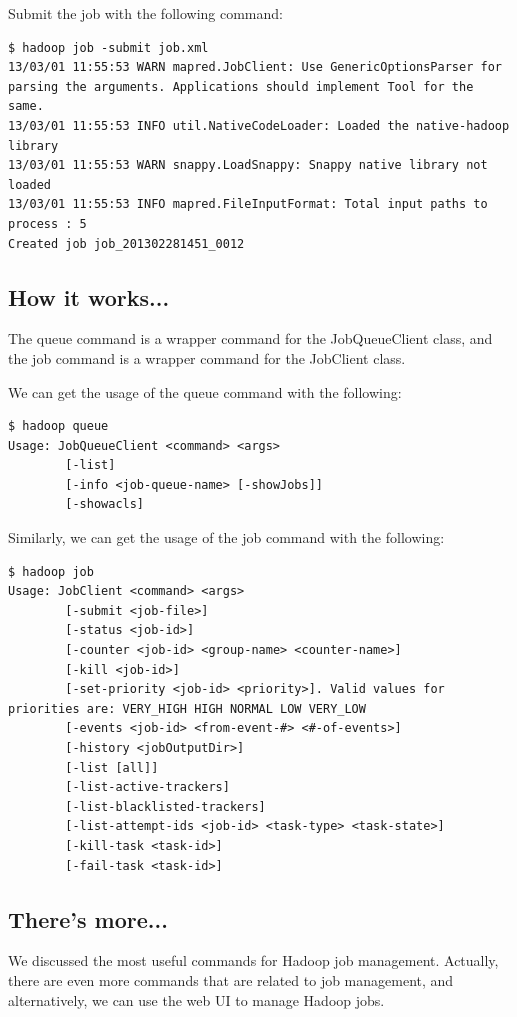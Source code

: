 Submit the job with the following command:
\lstset{style=bashstyle}
\begin{lstlisting}
$ hadoop job -submit job.xml
13/03/01 11:55:53 WARN mapred.JobClient: Use GenericOptionsParser for parsing the arguments. Applications should implement Tool for the same.
13/03/01 11:55:53 INFO util.NativeCodeLoader: Loaded the native-hadoop library
13/03/01 11:55:53 WARN snappy.LoadSnappy: Snappy native library not loaded
13/03/01 11:55:53 INFO mapred.FileInputFormat: Total input paths to process : 5
Created job job_201302281451_0012
\end{lstlisting}
\subsection*{How it works...}
The queue command is a wrapper command for the JobQueueClient class, and the job command is a wrapper command for the JobClient class.

We can get the usage of the queue command with the following:
\begin{verbatim}
$ hadoop queue
Usage: JobQueueClient <command> <args>
        [-list]
        [-info <job-queue-name> [-showJobs]]
        [-showacls]
\end{verbatim}

Similarly, we can get the usage of the job command with the following: 
\lstset{style=bashstyle}
\begin{lstlisting}
$ hadoop job
Usage: JobClient <command> <args>
        [-submit <job-file>]
        [-status <job-id>]
        [-counter <job-id> <group-name> <counter-name>]
        [-kill <job-id>]
        [-set-priority <job-id> <priority>]. Valid values for priorities are: VERY_HIGH HIGH NORMAL LOW VERY_LOW
        [-events <job-id> <from-event-#> <#-of-events>]
        [-history <jobOutputDir>]
        [-list [all]]
        [-list-active-trackers]
        [-list-blacklisted-trackers]
        [-list-attempt-ids <job-id> <task-type> <task-state>]
        [-kill-task <task-id>]
        [-fail-task <task-id>]
\end{lstlisting}
\subsection*{There's more...}
We discussed the most useful commands for Hadoop job management. Actually, there are even more commands that are related to job management, and alternatively, we can use the web UI to manage Hadoop jobs.


